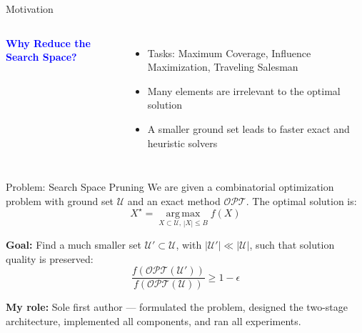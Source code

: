 \documentclass[aspectratio=169,xcolor=dvipsnames]{beamer}
\begin{document}

\begin{frame}[plain]{Motivation}
    \begin{columns}[T,onlytextwidth]
        \textbf{\textcolor{blue}{Why Reduce the Search Space?}}
        \begin{itemize}
            \item[\faTasks] Tasks: Maximum Coverage, Influence Maximization, Traveling Salesman
            \item[\faFilter] Many elements are irrelevant to the optimal solution
            \item[\faBolt] A smaller ground set leads to faster exact and heuristic solvers
        \end{itemize}

    \end{columns}
\end{frame}

\begin{frame}[plain]{Problem: Search Space Pruning}
We are given a combinatorial optimization problem with ground set $\mathcal{U}$ and an exact method $\mathcal{OPT}$.
The optimal solution is:
\[X^\star = \operatorname*{arg\,max}_{X \subset \mathcal{U},\, |X| \leq B} f(X)\]

\textbf{Goal:} Find a much smaller set $\mathcal{U}' \subset \mathcal{U}$, with $|\mathcal{U}'| \ll |\mathcal{U}|$, such that solution quality is preserved:
\[
\frac{f\!\left(\mathcal{OPT}(\mathcal{U}')\right)}{f\!\left(\mathcal{OPT}(\mathcal{U})\right)} \geq 1 - \epsilon
\]

\textbf{My role:} Sole first author — formulated the problem, designed the two-stage architecture, implemented all components, and ran all experiments.
\end{frame}
\end{document}
